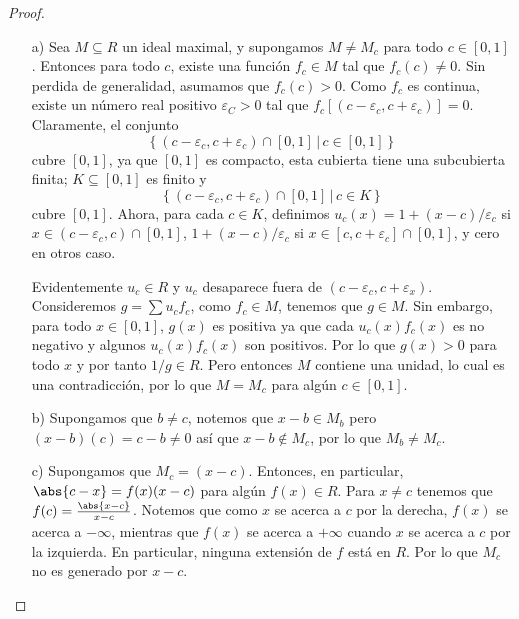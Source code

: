 \begin{problem}[33]
\end{problem}

\begin{proof}
    \begin{enumerate}
        \item[a)] Sea $M \subseteq R$ un ideal maximal, y supongamos $M \neq M_c$ para todo $c \in [0,1]$. Entonces para todo $c$, existe una función $f_c \in M$ tal que $f_c(c) \neq 0$. Sin perdida de generalidad, asumamos que $f_c(c) > 0$. Como $f_c$ es continua, existe un número real positivo $\varepsilon_C > 0$ tal que $f_c[(c-\varepsilon_c, c+\varepsilon_c)] = 0$. Claramente, el conjunto 
        $$ \left\{ (c-\varepsilon_c, c+\varepsilon_c) \cap [0,1] \, | \, c \in [0,1] \right\}$$
        cubre $[0,1]$, ya que $[0,1]$ es compacto, esta cubierta tiene una subcubierta finita;  $K \subseteq [0,1]$ es finito y 
        $$ \left\{ (c-\varepsilon_c, c+\varepsilon_c) \cap [0,1] \, | \, c \in K \right\} $$
        cubre $[0,1]$. Ahora, para cada $c \in K$, definimos $u_c(x) = 1 + (x-c)/\varepsilon_c$ si $x \in (c-\varepsilon_c,c) \cap [0,1]$, $1 + (x-c)/\varepsilon_c$ si $x \in [c, c+\varepsilon_c] \cap [0,1]$, y cero en otros caso.

        Evidentemente $u_c \in R$ y $u_c$ desaparece fuera de $(c-\varepsilon_c, c+\varepsilon_x)$. Consideremos $g = \sum u_c f_c$, como $f_c \in M$, tenemos que $g \in M$. Sin embargo, para todo $x \in [0,1]$, $g(x)$ es positiva ya que cada $u_c(x)f_c(x)$ es no negativo y algunos $u_c(x)f_c(x)$ son positivos. Por lo que $g(x) > 0$ para todo $x$ y por tanto $1/g \in R$. Pero entonces $M$ contiene una unidad, lo cual es una contradicción, por lo que $M = M_c$ para algún $c \in [0,1]$.

        \item[b)] Supongamos que $b \neq c$, notemos que $x-b \in M_b$ pero $(x-b)(c) = c-b \neq 0$ así que $x-b \notin M_c$, por lo que $M_b \neq M_c$.
        
        \item[c)] Supongamos que $M_c = (x-c)$. Entonces, en particular, $\abs{c-x} = f(x)(x-c)$ para algún $f(x) \in R$. Para $x \neq c$ tenemos que $f(c) = \frac{\abs{x-c}}{x-c}$. Notemos que como $x$ se acerca a $c$ por la derecha, $f(x)$ se acerca a $-\infty$, mientras que $f(x)$ se acerca a $+\infty$ cuando $x$ se acerca a $c$ por la izquierda. En particular, ninguna extensión de $f$ está en $R$. Por lo que $M_c$ no es generado por $x-c$.
    

\end{enumerate}
\end{proof}
